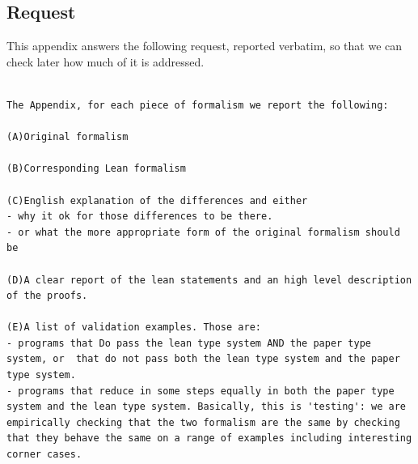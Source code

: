 \subsection{Request}
This appendix answers the following request, reported verbatim, so that we can check later how much of it is addressed.
\begin{lstlisting}[language={},basicstyle=\small\ttfamily,breaklines=true,columns=fullflexible]

The Appendix, for each piece of formalism we report the following:

(A)Original formalism

(B)Corresponding Lean formalism

(C)English explanation of the differences and either
- why it ok for those differences to be there.
- or what the more appropriate form of the original formalism should be

(D)A clear report of the lean statements and an high level description of the proofs.

(E)A list of validation examples. Those are:
- programs that Do pass the lean type system AND the paper type system, or  that do not pass both the lean type system and the paper type system.
- programs that reduce in some steps equally in both the paper type system and the lean type system. Basically, this is 'testing': we are empirically checking that the two formalism are the same by checking that they behave the same on a range of examples including interesting corner cases.
\end{lstlisting}

